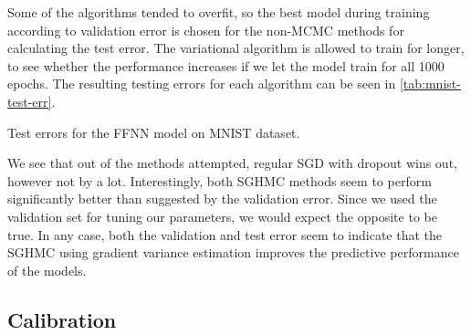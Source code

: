 Some of the algorithms tended to overfit, so the best model during training according to validation error is chosen for the non-MCMC methods for calculating the test error.
The variational algorithm is allowed to train for longer, to see whether the performance increases if we let the model train for all 1000 epochs. 
The resulting testing errors for each algorithm can be seen in \cref{tab:mnist-test-err}.
\begin{table}[htbp]
    \centering
    
    \caption{Test errors for the FFNN model on MNIST dataset.}
    \label{tab:mnist-test-err}
\end{table}
We see that out of the methods attempted, regular SGD with dropout wins out, however not by a lot. 
Interestingly, both SGHMC methods seem to perform significantly better than suggested by the validation error. 
Since we used the validation set for tuning our parameters, we would expect the opposite to be true. 
In any case, both the validation and test error seem to indicate that the SGHMC using gradient variance estimation improves the predictive performance of the models.

\subsection{Calibration}

